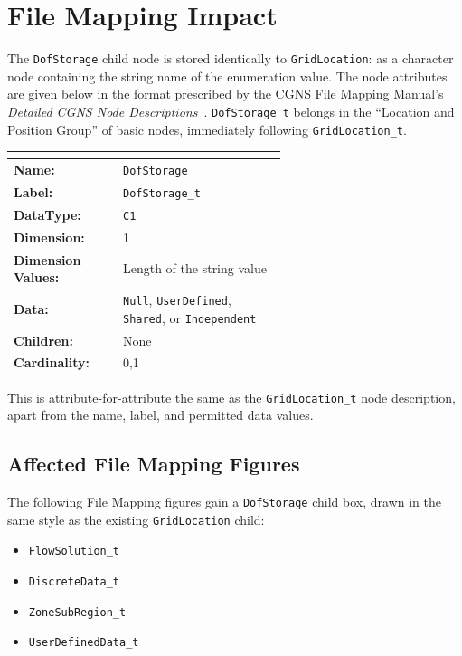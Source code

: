 \documentclass[11pt,letterpaper]{article}
\begin{document}
\section{File Mapping Impact}

The \texttt{DofStorage} child node is stored identically
to \texttt{GridLocation}: as a character node containing the string
name of the enumeration value.  The node attributes are given below in
the format prescribed by the CGNS File Mapping Manual's
\emph{Detailed CGNS Node Descriptions}~\cite{cgns-fmm}.
\texttt{DofStorage\_t} belongs in the ``Location and Position Group''
of basic nodes, immediately following \texttt{GridLocation\_t}.

\begin{center}
\begin{tabular}{@{} >{\bfseries}l p{0.60\linewidth} @{}}
\multicolumn{2}{@{}l}{\textbf{Node Attributes:} \texttt{DofStorage\_t}} \\
\toprule
Name: & \texttt{DofStorage} \\
Label: & \texttt{DofStorage\_t} \\
DataType: & \texttt{C1} \\
Dimension: & 1 \\
Dimension Values: & Length of the string value \\
Data: & \texttt{Null}, \texttt{UserDefined}, \texttt{Shared},
        or \texttt{Independent} \\
Children: & None \\
Cardinality: & 0,1 \\
\bottomrule
\end{tabular}
\end{center}

\noindent This is attribute-for-attribute the same as the
\texttt{GridLocation\_t} node description, apart from the name, label,
and permitted data values.

\subsection{Affected File Mapping Figures}

The following File Mapping figures gain a \texttt{DofStorage} child
box, drawn in the same style as the existing \texttt{GridLocation}
child:

\begin{itemize}[leftmargin=2em]
\item \texttt{FlowSolution\_t}
\item \texttt{DiscreteData\_t}
\item \texttt{ZoneSubRegion\_t}
\item \texttt{UserDefinedData\_t}
\end{itemize}
\end{document}
